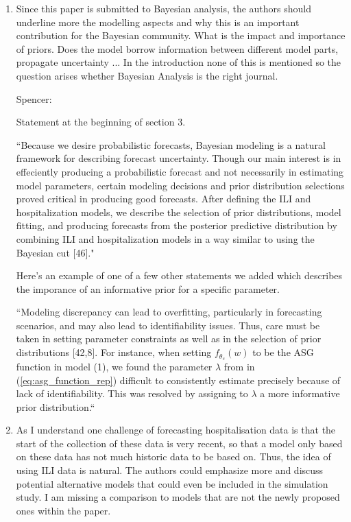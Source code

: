\documentclass{article}
\newcommand{\spencer}[1]{{\color{blue} Spencer: #1}}
\begin{document}
\begin{enumerate}[1.]

\item Since this paper is submitted to Bayesian analysis, the authors should 
underline more the modelling aspects and why this is an important contribution 
for the Bayesian community. What is the impact and importance of priors. Does 
the model borrow information between different model parts, propagate 
uncertainty ... In the introduction none of this is mentioned so the question 
arises whether Bayesian Analysis is the right journal.

\spencer{

Statement at the beginning of section 3.

``Because we desire probabilistic forecasts, Bayesian modeling is a 
natural framework for describing forecast uncertainty. 
Though our main interest is in effeciently producing a probabilistic 
forecast and not 
necessarily in estimating model parameters, certain modeling decisions and 
prior distribution selections proved critical in producing good 
forecasts. After defining the ILI and hospitalization models, 
we describe the 
selection of prior distributions, model fitting, and producing forecasts
from the posterior predictive distribution by combining ILI and hospitalization
models in a way similar to using the 
Bayesian cut [46]."


Here's an example of one of a 
few other statements we added which describes the imporance of 
an informative prior for a 
specific parameter.

``Modeling discrepancy can lead to 
overfitting, particularly in forecasting scenarios, and may also lead to 
identifiability issues. 
Thus, care must be taken in setting parameter constraints as well as in the 
selection of prior distributions [42,8]. 
For instance, when setting $f_{\theta_s}(w)$ to
be the ASG function
in model (1), we found the parameter $\lambda$ from 
in (\ref{eq:asg_function_rep}) difficult to consistently 
estimate precisely because of lack of identifiability. This was resolved by 
assigning to $\lambda$ a more informative prior distribution.``}

\item As I understand one challenge of forecasting hospitalisation data is that the 
start of the collection of these data is very recent, so that a model only 
based on these data has not much historic data to be based on. Thus, the idea 
of using ILI data is natural. The authors could emphasize more and discuss 
potential alternative models that could even be included in the simulation 
study. I am missing a comparison to models that are not the newly proposed 
ones within the paper.



\end{enumerate}
\end{document}
